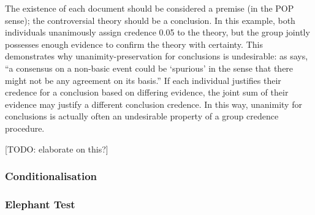 \documentclass{article}
\begin{document}
\noindent
The existence of each document should be considered a premise (in the POP sense); the controversial theory should be a conclusion. In this example, both individuals unanimously assign credence 0.05 to the theory, but the group jointly possesses enough evidence to confirm the theory with certainty. This demonstrates why unanimity-preservation for conclusions is undesirable: as \citet{dietrich2013probabilistic} says, ``a consensus on a non-basic event could be `spurious' in the sense that there might not be any agreement on its basis.'' If each individual justifies their credence for a conclusion based on differing evidence, the joint sum of their evidence may justify a different conclusion credence. In this way, unanimity for conclusions is actually often an undesirable property of a group credence procedure.

[TODO: elaborate on this?]

\subsubsection{Conditionalisation}
\subsubsection{Elephant Test}



\end{document}
